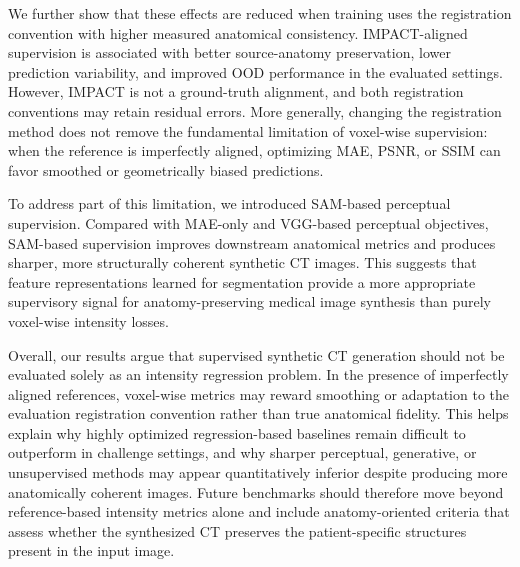 \documentclass[lettersize,journal]{IEEEtran}
\begin{document}
We further show that these effects are reduced when training uses the registration convention with higher measured anatomical consistency. IMPACT-aligned supervision is associated with better source-anatomy preservation, lower prediction variability, and improved OOD performance in the evaluated settings. However, IMPACT is not a ground-truth alignment, and both registration conventions may retain residual errors. More generally, changing the registration method does not remove the fundamental limitation of voxel-wise supervision: when the reference is imperfectly aligned, optimizing MAE, PSNR, or SSIM can favor smoothed or geometrically biased predictions.

To address part of this limitation, we introduced SAM-based perceptual supervision. Compared with MAE-only and VGG-based perceptual objectives,
SAM-based supervision improves downstream anatomical metrics and produces sharper, more structurally coherent synthetic CT images. This suggests that feature representations learned for segmentation provide a more appropriate supervisory signal for anatomy-preserving medical image synthesis than purely voxel-wise intensity losses.

Overall, our results argue that supervised synthetic CT generation should not be evaluated solely as an intensity regression problem. In the presence of imperfectly aligned references, voxel-wise metrics may reward smoothing or adaptation to the evaluation registration convention rather than true anatomical fidelity. This helps explain why highly optimized regression-based baselines remain difficult to outperform in challenge settings, and why sharper perceptual, generative, or unsupervised methods may appear quantitatively inferior despite producing more anatomically coherent images. Future benchmarks should therefore move beyond reference-based intensity metrics alone and include anatomy-oriented criteria that assess whether the synthesized CT preserves the patient-specific structures present in the input image.
\end{document}
